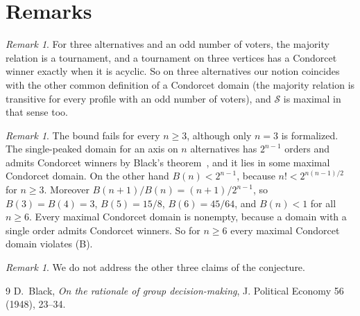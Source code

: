 \documentclass[11pt]{article}
\theoremstyle{plain}
\theoremstyle{definition}
\theoremstyle{remark}
\newtheorem{remark}[theorem]{Remark}
\newcommand{\SP}{\mathcal S}
\begin{document}
\section{Remarks}

\begin{remark}
For three alternatives and an odd number of voters, the majority relation is a
tournament, and a tournament on three vertices has a Condorcet winner exactly when
it is acyclic. So on three alternatives our notion coincides with the other common
definition of a Condorcet domain (the majority relation is transitive for every
profile with an odd number of voters), and $\SP$ is maximal in that sense too.
\end{remark}

\begin{remark}
The bound fails for every $n\ge3$, although only $n=3$ is formalized. The
single-peaked domain for an axis on $n$ alternatives has $2^{n-1}$ orders and admits
Condorcet winners by Black's theorem~\cite{black}, and it lies in some maximal
Condorcet domain. On the other hand $B(n)<2^{n-1}$, because
$n!<2^{n(n-1)/2}$ for $n\ge3$. Moreover $B(n+1)/B(n)=(n+1)/2^{n-1}$, so
$B(3)=B(4)=3$, $B(5)=15/8$, $B(6)=45/64$, and $B(n)<1$ for all $n\ge6$. Every
maximal Condorcet domain is nonempty, because a domain with a single order admits
Condorcet winners. So for $n\ge6$ every maximal Condorcet domain violates (B).
\end{remark}

\begin{remark}
We do not address the other three claims of the conjecture.
\end{remark}

\begin{thebibliography}{9}
 D.~Black, \emph{On the rationale of group decision-making},
  J. Political Economy 56 (1948), 23--34.
\end{thebibliography}
\end{document}
